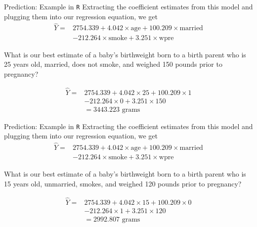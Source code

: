 \documentclass[10pt,t]{beamer}
\begin{document}
\begin{frame}{Prediction: Example in \texttt{R}}
Extracting the coefficient estimates from this model and plugging them into our regression equation, we get
\begin{align*}
\hat{Y} = & 2754.339 + 4.042 \times \text{age} + 100.209 \times \text{married} \\
& - 212.264 \times \text{smoke} + 3.251 \times \text{wpre} 
\end{align*} \pause

What is our best estimate of a baby's birthweight born to a birth parent who is 25 years old, married, does not smoke, and weighed 150 pounds prior to pregnancy? \pause

\begin{align*}
\hat{Y} = & 2754.339 + 4.042 \times 25 + 100.209 \times 1 \\
& - 212.264 \times 0 + 3.251 \times 150  \\
& = 3443.223 \text{ grams}
\end{align*}

\end{frame}

\begin{frame}{Prediction: Example in \texttt{R}}
Extracting the coefficient estimates from this model and plugging them into our regression equation, we get
\begin{align*}
\hat{Y} = & 2754.339 + 4.042 \times \text{age} + 100.209 \times \text{married} \\
& - 212.264 \times \text{smoke} + 3.251 \times \text{wpre}
\end{align*}

What is our best estimate of a baby's birthweight born to a birth parent who is 15 years old, unmarried, smokes, and weighed 120 pounds prior to pregnancy? \pause

\begin{align*}
\hat{Y} = & 2754.339 + 4.042 \times 15 + 100.209 \times 0 \\
& - 212.264 \times 1 + 3.251 \times 120  \\
& = 2992.807 \text{ grams}
\end{align*}

\end{frame}
\end{document}
